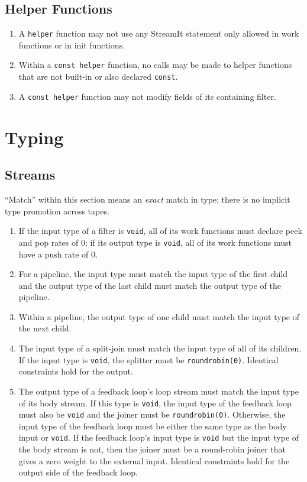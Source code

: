 \documentclass[11pt]{article}
\begin{document}
\subsection{Helper Functions}

\begin{enumerate}
\item A \lstinline|helper| function may not use any StreamIt statement
  only allowed in work functions or in init functions.
\item Within a \lstinline|const helper| function, no calls may be made
  to helper functions that are not built-in or also declared
  \lstinline|const|.
\item A \lstinline|const helper| function may not modify fields of its
  containing filter.
\end{enumerate}

\section{Typing}

\subsection{Streams}

``Match'' within this section means an \emph{exact} match in type;
there is no implicit type promotion across tapes.

\begin{enumerate}
\item If the input type of a filter is \lstinline|void|, all of its
  work functions must declare peek and pop rates of 0; if its output
  type is \lstinline|void|, all of its work functions must have a push
  rate of 0.
\item For a pipeline, the input type must match the input type of the
  first child and the output type of the last child must match the
  output type of the pipeline.
\item Within a pipeline, the output type of one child must match the
  input type of the next child.
\item The input type of a split-join must match the input type of all
  of its children.  If the input type is \lstinline|void|, the
  splitter must be \lstinline|roundrobin(0)|.  Identical constraints
  hold for the output.
\item The output type of a feedback loop's loop stream must match the
  input type of its body stream.  If this type is \lstinline|void|,
  the input type of the feedback loop must also be \lstinline|void|
  and the joiner must be \lstinline|roundrobin(0)|.  Otherwise, the
  input type of the feedback loop must be either the same type as the
  body input or \lstinline|void|.  If the feedback loop's input type
  is \lstinline|void| but the input type of the body stream is not,
  then the joiner must be a round-robin joiner that gives a zero
  weight to the external input.  Identical constraints hold for the
  output side of the feedback loop.
\end{enumerate}
\end{document}
